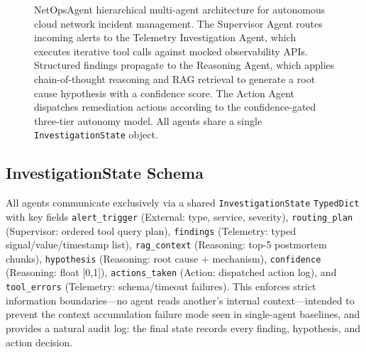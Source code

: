 \documentclass[10pt,conference]{IEEEtran}
\begin{document}
\begin{figure}[t]
{%
}
\caption{NetOpsAgent hierarchical multi-agent architecture for autonomous
cloud network incident management. The Supervisor Agent routes incoming
alerts to the Telemetry Investigation Agent, which executes iterative tool
calls against mocked observability APIs. Structured findings propagate to the
Reasoning Agent, which applies chain-of-thought reasoning and RAG retrieval to
generate a root cause hypothesis with a confidence score. The Action Agent
dispatches remediation actions according to the confidence-gated three-tier
autonomy model. All agents share a single \texttt{InvestigationState} object.
}
\label{fig:arch}
\end{figure}

\subsection{InvestigationState Schema}
All agents communicate exclusively via a shared \texttt{InvestigationState}
\texttt{TypedDict} with key fields
\texttt{alert\_trigger} (External: type, service, severity),
\texttt{routing\_plan} (Supervisor: ordered tool query plan),
\texttt{findings} (Telemetry: typed signal/value/timestamp list),
\texttt{rag\_context} (Reasoning: top-5 postmortem chunks),
\texttt{hypothesis} (Reasoning: root cause + mechanism),
\texttt{confidence} (Reasoning: float [0,1]),
\texttt{actions\_taken} (Action: dispatched action log), and
\texttt{tool\_errors} (Telemetry: schema/timeout failures). This enforces
strict information boundaries---no agent reads another's internal
context---intended to prevent the context accumulation failure mode seen
in single-agent baselines, and provides a natural audit log: the final
state records every finding, hypothesis, and action decision.
\end{document}

